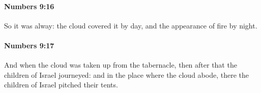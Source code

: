 		\paragraph{Numbers 9:16} %
			\label{NUMBERS-9-16}

			So it was alway: the cloud covered it by day, and the appearance of fire by night.


		\paragraph{Numbers 9:17} %
			\label{NUMBERS-9-17}

			And when the cloud was taken up from the tabernacle, then after that the children of Israel journeyed: and in the place where the cloud abode, there the children of Israel pitched their tents.


